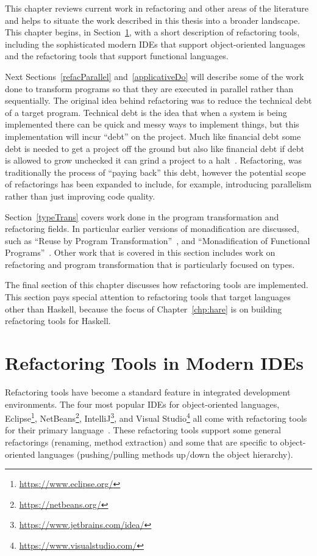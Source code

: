 This chapter reviews current work in refactoring and other areas of the literature and helps to situate the work described in this thesis into a broader landscape. This chapter begins, in Section~\ref{ideTools}, with a short description of refactoring tools, including the sophisticated modern IDEs that support object-oriented languages and the refactoring tools that support functional languages. 

Next Sections~\ref{refacParallel} and~\ref{applicativeDo} will describe some of the work done to transform programs so that they are executed in parallel rather than sequentially. The original idea behind refactoring was to reduce the technical debt of a target program. Technical debt is the idea that when a system is being implemented there can be quick and messy ways to implement things, but this implementation will incur ``debt'' on the project. Much like financial debt some debt is needed to get a project off the ground but also like financial debt if debt is allowed to grow unchecked it can grind a project to a halt~\citep{techDebt}. Refactoring, was traditionally the process of ``paying back'' this debt, however the potential scope of refactorings has been expanded to include, for example, introducing parallelism rather than just improving code quality. 

Section~\ref{typeTrans} covers work done in the program transformation and refactoring fields. In particular earlier versions of monadification are discussed, such as ``Reuse by Program Transformation''~\citep{lammelReuse}, and ``Monadification of Functional Programs''~\citep{monadification}. Other work that is covered in this section includes work on refactoring and program transformation that is particularly focused on types.

The final section of this chapter discusses how refactoring tools are implemented. This section pays special attention to refactoring tools that target languages other than Haskell, because the focus of Chapter~\ref{chp:hare} is on building refactoring tools for Haskell.

\section{Refactoring Tools in Modern IDEs}\label{ideTools}
Refactoring tools have become a standard feature in integrated development environments. The four most popular IDEs for object-oriented languages, Eclipse\footnote{\url{https://www.eclipse.org/}}, NetBeans\footnote{\url{https://netbeans.org/}}, IntelliJ\footnote{\url{https://www.jetbrains.com/idea/}}, and Visual Studio\footnote{\url{https://www.visualstudio.com/}} all come with refactoring tools for their primary language~\citep{ides}. These refactoring tools support some general refactorings (renaming, method extraction) and some that are specific to object-oriented languages (pushing/pulling methods up/down the object hierarchy). 

